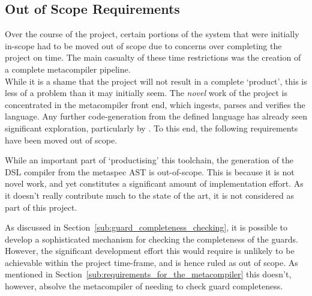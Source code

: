 
\subsection{Out of Scope Requirements} %
\label{sub:out_of_scope_requirements}
Over the course of the project, certain portions of the system that were initially in-scope had to be moved out of scope due to concerns over completing the project on time.
The main casualty of these time restrictions was the creation of a complete metacompiler pipeline.\\

While it is a shame that the project will not result in a complete `product', this is less of a problem than it may initially seem.
The \textit{novel} work of the project is concentrated in the metacompiler front end, which ingests, parses and verifies the language. 
Any further code-generation from the defined language has already seen significant exploration, particularly by \citet{diehl1996semantics}.
To this end, the following requirements have been moved out of scope.\\


While an important part of `productising' this toolchain, the generation of the DSL compiler from the metaspec AST is out-of-scope.
This is because it is not novel work, and yet constitutes a significant amount of implementation effort. 
As it doesn't really contribute much to the state of the art, it is not considered as part of this project.\\


As discussed in Section~\ref{sub:guard_completeness_checking}, it is possible to develop a sophisticated mechanism for checking the completeness of the guards.
However, the significant development effort this would require is unlikely to be achievable within the project time-frame, and is hence ruled as out of scope. 
As mentioned in Section~\ref{sub:requirements_for_the_metacompiler} this doesn't, however, absolve the metacompiler of needing to check guard completeness. 

